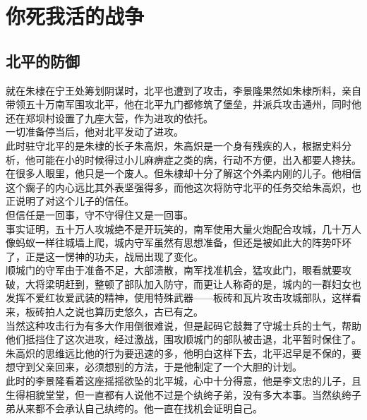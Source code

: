 \section{你死我活的战争}
\ifnum{}
	\begin{multicols}{\theparacolNo}
\fi
\subsection{北平的防御}
就在朱棣在宁王处筹划阴谋时，北平也遭到了攻击，李景隆果然如朱棣所料，亲自带领五十万南军围攻北平，他在北平九门都修筑了堡垒，并派兵攻击通州，同时他还在郑坝村设置了九座大营，作为进攻的依托。\\

一切准备停当后，他对北平发动了进攻。\\

此时驻守北平的是朱棣的长子朱高炽，朱高炽是一个身有残疾的人，根据史料分析，他可能在小的时候得过小儿麻痹症之类的病，行动不方便，出入都要人搀扶。在很多人眼里，他只是一个废人。但朱棣却十分了解这个外柔内刚的儿子。他相信这个瘸子的内心远比其外表坚强得多，而他这次将防守北平的任务交给朱高炽，也正说明了对这个儿子的信任。\\

但信任是一回事，守不守得住又是一回事。\\

事实证明，五十万人攻城绝不是开玩笑的，南军使用大量火炮配合攻城，几十万人像蚂蚁一样往城墙上爬，城内守军虽然有思想准备，但还是被如此大的阵势吓坏了，正是这一愣神的功夫，战局出现了变化。\\

顺城门的守军由于准备不足，大部溃散，南军找准机会，猛攻此门，眼看就要攻破，大将梁明赶到，整顿了部队加入防守，而更让人称奇的是，城内的一群妇女也发挥不爱红妆爱武装的精神，使用特殊武器——板砖和瓦片攻击攻城部队，这样看来，板砖拍人之说也算历史悠久，古已有之。\\

当然这种攻击行为有多大作用倒很难说，但是起码它鼓舞了守城士兵的士气，帮助他们抵挡住了这次进攻，经过激战，围攻顺城门的部队被击退，北平暂时保住了。\\

朱高炽的思维远比他的行为要迅速的多，他明白这样下去，北平迟早是不保的，要想守到父亲回来，必须想别的方法，于是他制定了一个大胆的计划。\\

此时的李景隆看着这座摇摇欲坠的北平城，心中十分得意，他是李文忠的儿子，且生得相貌堂堂，但一直都有人说他不过是个纨绔子弟，没有多大本事。当然纨绔子弟从来都不会承认自己纨绔的。他一直在找机会证明自己。\\


\end{multicols}
